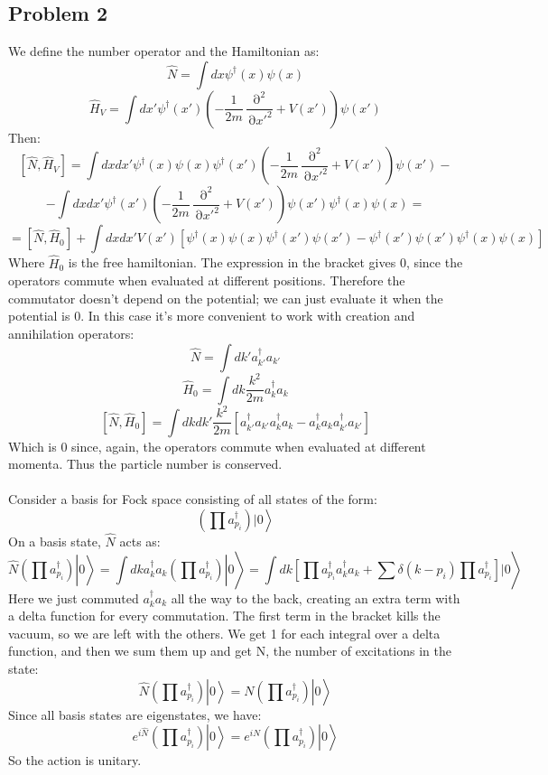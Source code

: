 \documentclass[12 pt]{article}
\DeclareMathOperator {\p} {\partial}
\DeclareMathOperator {\ran} {\rangle}
\begin{document}
\subsection*{Problem 2}
We define the number operator and the Hamiltonian as:
\[    \hat N = \int dx \psi^{\dagger} (x) \psi(x)    \]
\[   \hat H_V = \int dx' \psi^{\dagger} (x') \left(-\frac{1}{2m} \frac{\p^2}{\p x'^2} + V(x') \right) \psi (x')   \]
Then:
\[      [\hat N, \hat H_V] = \int dx dx'  \psi^{\dagger} (x) \psi(x) \psi^{\dagger} (x') \left(-\frac{1}{2m} \frac{\p^2}{\p x'^2} + V(x') \right) \psi (x')  - \]
\[  - \int dx dx' \psi^{\dagger} (x') \left(-\frac{1}{2m} \frac{\p^2}{\p x'^2} + V(x') \right) \psi (x') \psi^{\dagger} (x) \psi(x)   =  \]
\[   =  [\hat N, \hat H_0] +   \int dx dx' V(x') \left[ \psi^{\dagger} (x) \psi(x) \psi^{\dagger} (x') \psi (x')  - \psi^{\dagger} (x') \psi(x') \psi^{\dagger} (x) \psi (x) \right] \]
Where $\hat H_0$ is the free hamiltonian. The expression in the bracket gives 0, since the operators commute when evaluated at different positions. Therefore the commutator doesn't depend on the potential; we can just evaluate it when the potential is 0. In this case it's more convenient to work with creation and annihilation operators:
\[     \hat N = \int dk' a_{k'}^{\dagger} a_{k'}      \]
\[     \hat H_0 = \int dk \frac{k^2}{2m} a_k^{\dagger} a_k   \]
\[     [ \hat N , \hat H_0 ] = \int dk dk' \frac{k^2}{2m} \left[ a^{\dagger}_{k'} a_{k'} a^{\dagger}_{k} a_{k} - a^{\dagger}_{k} a_{k} a^{\dagger}_{k'} a_{k'}      \right]   \]
Which is 0 since, again, the operators commute when evaluated at different momenta. Thus the particle number is conserved.
\\
\\
Consider a basis for Fock space consisting of all states of the form:
\[               \left( \prod  a^{\dagger}_{p_i}  \right) |0\ran                   \]
On a basis state, $\hat N$ acts as:
\[     \hat N   \left( \prod  a^{\dagger}_{p_i}  \right) |0\ran  = \int dk a_k^{\dagger} a_k  \left( \prod  a^{\dagger}_{p_i}  \right) |0\ran  = \int dk \left[   \prod  a^{\dagger}_{p_i} a^{\dagger}_k a_k   +   \sum \delta(k - p_i) \prod  a^{\dagger}_{p_i}  \right]  |0\ran  \]
Here we just commuted $a_k^{\dagger} a_k$ all the way to the back, creating an extra term with a delta function for every commutation. The first term in the bracket kills the vacuum, so we are left with the others. We get 1 for each integral over a delta function, and then we sum them up and get N, the number of excitations in the state:
\[      \hat N   \left( \prod  a^{\dagger}_{p_i}  \right) |0\ran  = N   \left( \prod  a^{\dagger}_{p_i}  \right) |0\ran        \]
Since all basis states are eigenstates, we have:
\[     e^{i\hat N}   \left( \prod  a^{\dagger}_{p_i}  \right) |0\ran  =  e^{i N}   \left( \prod  a^{\dagger}_{p_i}  \right) |0\ran   \]
So the action is unitary.
\end{document}
